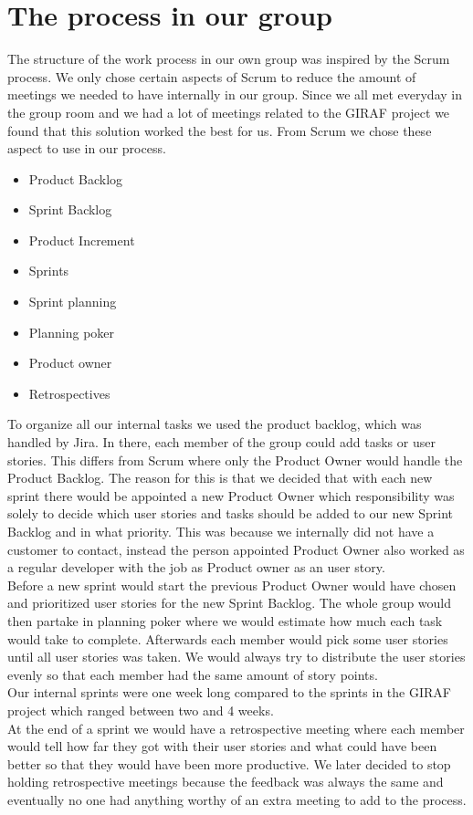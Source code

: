 \section{The process in our group}

The structure of the work process in our own group was inspired by the Scrum process.
We only chose certain aspects of Scrum to reduce the amount of meetings we needed to have internally in our group. 
Since we all met everyday in the group room and we had a lot of meetings related to the GIRAF project we found that this solution worked the best for us.
From Scrum we chose these aspect to use in our process.

 \begin{itemize}
    \item Product Backlog
    \item Sprint Backlog
    \item Product Increment
    \item Sprints
    \item Sprint planning
    \item Planning poker
    \item Product owner
    \item Retrospectives
 \end{itemize}
To organize all our internal tasks we used the product backlog, which was handled by Jira.
In there, each member of the group could add tasks or user stories.
This differs from Scrum where only the Product Owner would handle the Product Backlog.
The reason for this is that we decided that with each new sprint there would be appointed a new Product Owner which responsibility was solely to decide which user stories and tasks should be added to our new Sprint Backlog and in what priority.
This was because we internally did not have a customer to contact, instead the person appointed Product Owner also worked as a regular developer with the job as Product owner as an user story.
\\
Before a new sprint would start the previous Product Owner would have chosen and prioritized user stories for the new Sprint Backlog.
The whole group would then partake in planning poker where we would estimate how much each task would take to complete.
Afterwards each member would pick some user stories until all user stories was taken.
We would always try to distribute the user stories evenly so that each member had the same amount of story points.
\\
Our internal sprints were one week long compared to the sprints in the GIRAF project which ranged between two and 4 weeks.
\\
At the end of a sprint we would have a retrospective meeting where each member would tell how far they got with their user stories and what could have been better so that they would have been more productive.
We later decided to stop holding retrospective meetings because the feedback was always the same and eventually no one had anything worthy of an extra meeting to add to the process.


